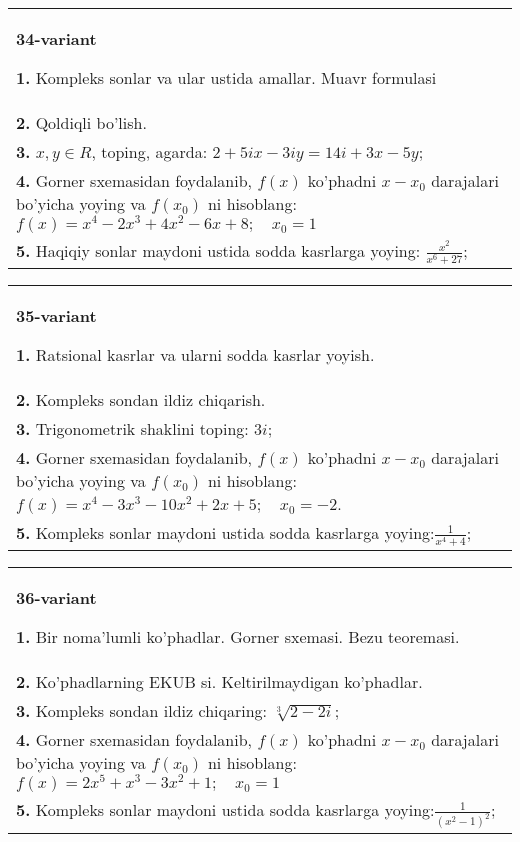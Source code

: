 \documentclass{article}
\begin{document}
\begin{tabular}{m{17cm}}
\textbf{34-variant}
\newline

\textbf{1.} Kompleks sonlar va ular ustida amallar. Muavr formulasi  \\
\textbf{2.} Qoldiqli bo’lish.  \\
\textbf{3.}  $x, y \in R$, toping, agarda: $2+5 i x-3 i y=14 i+3 x-5 y$; \\
\textbf{4.} Gorner sxemasidan foydalanib, $f(x)$ ko’phadni $x-x_0$ darajalari bo’yicha yoying va $f\left(x_0\right)$ ni hisoblang: $f(x)=x^4-2 x^3+4 x^2-6 x+8 ; \quad x_0=1$ \\
\textbf{5.} Haqiqiy sonlar maydoni ustida sodda kasrlarga yoying:  $\frac{x^2}{x^6+27}$; \\

\end{tabular}
\vspace{1cm}


\begin{tabular}{m{17cm}}
\textbf{35-variant}
\newline

\textbf{1.} Ratsional kasrlar va ularni sodda kasrlar yoyish. \\
\textbf{2.} Kompleks sondan ildiz chiqarish. \\
\textbf{3.} Trigonometrik shaklini toping: $3 i$; \\
\textbf{4.} Gorner sxemasidan foydalanib, $f(x)$ ko’phadni $x-x_0$ darajalari bo’yicha yoying va $f\left(x_0\right)$ ni hisoblang: $f(x)=x^4-3 x^3-10 x^2+2 x+5 ; \quad x_0=-2$. \\
\textbf{5.} Kompleks sonlar maydoni ustida sodda kasrlarga yoying:$\frac{1}{x^4+4}$; \\

\end{tabular}
\vspace{1cm}


\begin{tabular}{m{17cm}}
\textbf{36-variant}
\newline

\textbf{1.} Bir noma’lumli ko’phadlar. Gorner sxemasi. Bezu teoremasi.  \\
\textbf{2.} Ko’phadlarning EKUB si. Keltirilmaydigan ko’phadlar. \\
\textbf{3.} Kompleks sondan ildiz chiqaring: $\sqrt[3]{2-2 i}$; \\
\textbf{4.} Gorner sxemasidan foydalanib, $f(x)$ ko’phadni $x-x_0$ darajalari bo’yicha yoying va $f\left(x_0\right)$ ni hisoblang:  $f(x)=2 x^5+x^3-3 x^2+1 ; \quad x_0=1$ \\
\textbf{5.} Kompleks sonlar maydoni ustida sodda kasrlarga yoying:$\frac{1}{\left(x^2-1\right)^2}$; \\

\end{tabular}
\vspace{1cm}
\end{document}
